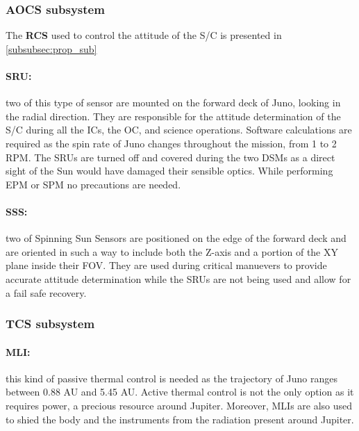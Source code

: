 \subsubsection{AOCS subsystem}
\label{subsubsec:aocs_sub}

\vspace{-1mm}

The \textbf{RCS} used to control the attitude of the S/C is presented in \autoref{subsubsec:prop_sub}

\vspace{-4mm}

\paragraph{SRU:}two of this type of sensor are mounted on the forward deck of Juno, looking in the radial direction. They are responsible for the attitude determination of the S/C during all the ICs, the OC, and science operations. Software calculations are required as the spin rate of Juno changes throughout the mission, from 1 to 2 RPM. The SRUs are turned off and covered during the two DSMs as a direct sight of the Sun would have damaged their sensible optics. While performing EPM or SPM no precautions are needed.\cite{SRU}

\vspace{-4mm}

\paragraph{SSS:}two of Spinning Sun Sensors are positioned on the edge of the forward deck and are oriented in such a way to include both the Z-axis and a portion of the XY plane inside their FOV. They are used during critical manuevers to provide accurate attitude determination while the SRUs are not being used and allow for a fail safe recovery.\cite{SSS}

\subsubsection{TCS subsystem}
\label{subsubsec:tcs_sub}

\vspace{-1mm}

\paragraph{MLI:}this kind of passive thermal control is needed as the trajectory of Juno ranges between 0.88 AU and 5.45 AU. Active thermal control is not the only option as it requires power, a precious resource around Jupiter. Moreover, MLIs are also used to shied the body and the instruments from the radiation present around Jupiter. 

